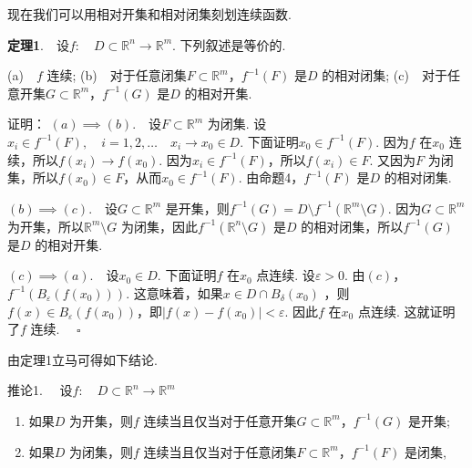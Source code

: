 \documentclass{article}
\begin{document}
\newpage

现在我们可以用相对开集和相对闭集刻划连续函数.

\vspace{10pt}

\textbf{定理1}.\ \ 设\(f:\quad D \subset \mathbb{R}^n \to \mathbb{R}^{m}\). 下列叙述是等价的.

(a)\ \ \(f\) 连续;\newline
(b)\ \ 对于任意闭集\(F \subset \mathbb{R}^{m}\)，\(f^{ - 1}(F)\) 是\(D\) 的相对闭集;\newline
(c)\ \ 对于任意开集\(G \subset \mathbb{R}^{m}\)，\(f^{ - 1}(G)\) 是\(D\) 的相对开集.\newline

\vspace{10pt}

证明：\newline
\((a) \implies (b)\).\ \ 设\(F \subset \mathbb{R}^{m}\) 为闭集. 设\(x_i \in f^{ - 1}(F),\quad i = 1,2,\dots \quad x_i \to x_0 \in D\). 下面证明\(x_0 \in f^{-1}(F)  \). 因为\(f\) 在\(x_0\) 连续，所以\(f(x_i) \to f(x_0) \). 因为\(x_i \in f^{-1}(F) \)，所以\(f(x_i)\in F \). 又因为\(F\) 为闭集，所以\(f(x_{0})\in F \)，从而\(x_0 \in f^{-1}(F) \). 由命题4，\(f^{-1}(F) \) 是\(D\) 的相对闭集.

\((b) \implies (c)\).\ \ 设\(G \subset \mathbb{R}^{m}\) 是开集，则\(f^{-1}(G) = D\setminus f^{-1}(\mathbb{R}^{m}\setminus G)  \). 因为\(G \subset \mathbb{R}^{m}\) 为开集，所以\(\mathbb{R}^{m}\setminus G\) 为闭集，因此\(f^{-1}(\mathbb{R}^n\setminus G) \) 是\(D\) 的相对闭集，所以\(f^{-1}(G) \) 是\(D\) 的相对开集.

\((c) \implies (a)\).\ \ 设\(x_0 \in D\). 下面证明\(f\) 在\(x_0\) 点连续. 设\(\varepsilon > 0\). 由\((c)\)，\(f^{-1}(B_{\varepsilon }(f(x_0))) \). 这意味着，如果\(x \in D \cap B_{\delta }(x_0)\) ，则\(f(x) \in B_{\varepsilon }(f(x_0))\)，即\(| f(x) - f(x_0)  |< \varepsilon  \). 因此\(f\) 在\(x_0\) 点连续. 这就证明了\(f\) 连续. \(\quad \square\)

\newpage

由定理1立马可得如下结论.

\vspace{10pt}

推论1. \ \ 设\(f:\quad D \subset \mathbb{R}^n \to \mathbb{R}^{m}\)
\begin{enumerate}
    \item 如果\(D\) 为开集，则\(f\) 连续当且仅当对于任意开集\(G \subset \mathbb{R}^{m}\)，\(f^{-1}(G) \) 是开集;
    \item 如果\(D\) 为闭集，则\(f\) 连续当且仅当对于任意闭集\(F \subset \mathbb{R}^{m}\)，\(f^{-1}(F) \) 是闭集,
\end{enumerate}
\end{document}
